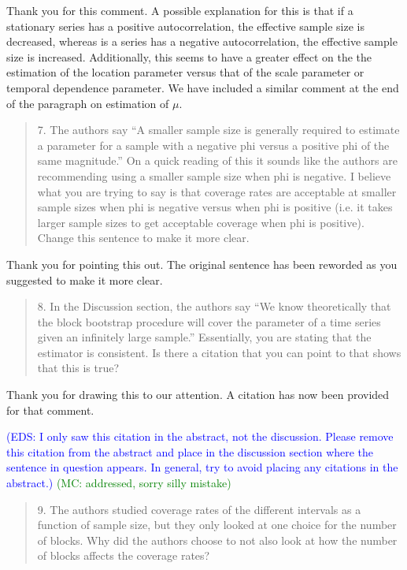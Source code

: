 \documentclass[12pt]{article}
\newcommand{\eds}[1]{\textcolor{blue}{(EDS: #1)}}
\newcommand{\mc}[1]{\textcolor{green}{(MC: #1)}}
\newenvironment{comment}%
{\begin{quotation}\noindent\small\it\color{darkblue}\ignorespaces%
}{\end{quotation}}
\begin{document}
Thank you for this comment.
A possible explanation for this is that if a 
stationary series has a positive 
autocorrelation, the effective sample
size is decreased, whereas is a series has a negative autocorrelation, the
effective sample size is increased. Additionally, this seems to have a 
greater effect on the the estimation of the location parameter versus that
of the scale parameter or temporal dependence parameter. We have included a 
similar
comment at the end of the paragraph on estimation of 
$\mu$.

\begin{comment}
7.  The authors say “A smaller sample size is generally required to estimate a 
parameter for a sample with a negative phi versus a positive phi of the same 
magnitude.”  On a quick reading of this it sounds like the authors are 
recommending using a smaller sample size when phi is negative.  I believe what 
you are trying to say is that coverage rates are acceptable at smaller sample 
sizes when phi is negative versus when phi is positive (i.e. it takes larger 
sample sizes to get acceptable coverage when phi is positive).  Change this 
sentence to make it more clear. 
\end{comment}

Thank you for pointing this out. The original sentence has been reworded as you
suggested to make it more clear.

\begin{comment}
8.   In the Discussion section, the authors say “We know theoretically that the 
block bootstrap procedure will cover the parameter of a time series given an 
infinitely large sample.”  Essentially, you are stating that the estimator is 
consistent.  Is there a citation that you can point to that shows that this is 
true? 
\end{comment}

Thank you for drawing this to our attention. A citation \citep{calhoun2018} has
now been provided for that comment.

\eds{I only saw this citation in the abstract, not the discussion.  
Please remove this citation from the abstract and place in the discussion 
section where the sentence in question appears. In general,
try to avoid placing any citations in the abstract.}
\mc{addressed, sorry silly mistake}

\begin{comment}
9.   The authors studied coverage rates of the different intervals as a function 
of sample size, but they only looked at one choice for the number of blocks.  
Why did the authors choose to not also look at how the number of blocks affects 
the coverage rates?
\end{comment}
\end{document}
